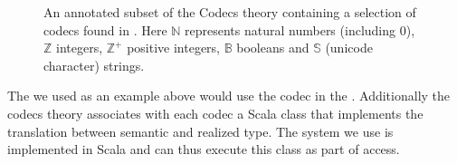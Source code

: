 \begin{figure}[ht]\centering
  \caption[List of Codecs]{
    An annotated subset of the Codecs theory containing a selection of codecs found in \mmt. 
    Here $\mathbb{N}$ represents natural numbers (including $0$), 
    $\mathbb{Z}$ integers, 
    $\mathbb{Z}^{+}$ positive integers, 
    $\mathbb{B}$ booleans and
    $\mathbb{S}$ (unicode character) strings. 
  }
  \label{fig:codecs}
\end{figure}
The  we used as an example above would use the  codec in the \lmfdb. 
Additionally the \textsf{codecs} theory associates with each codec a Scala class that implements the translation between semantic and realized type. 
The \mmt system we use is implemented in Scala and can thus execute this class as part of \lmfdb access. 

